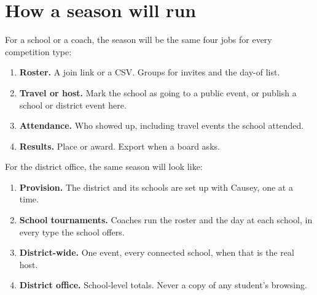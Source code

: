 \documentclass[11pt]{article}
\begin{document}
\section*{How a season will run}

For a school or a coach, the season will be the same four jobs for every competition type:

\begin{enumerate}
  \item \textbf{Roster.} A join link or a CSV. Groups for invites and the day-of list.
  \item \textbf{Travel or host.} Mark the school as going to a public event, or publish a school or district event here.
  \item \textbf{Attendance.} Who showed up, including travel events the school attended.
  \item \textbf{Results.} Place or award. Export when a board asks.
\end{enumerate}

For the district office, the same season will look like:

\begin{enumerate}
  \item \textbf{Provision.} The district and its schools are set up with Causey, one at a time.
  \item \textbf{School tournaments.} Coaches run the roster and the day at each school, in every type the school offers.
  \item \textbf{District-wide.} One event, every connected school, when that is the real host.
  \item \textbf{District office.} School-level totals. Never a copy of any student's browsing.
\end{enumerate}
\end{document}
